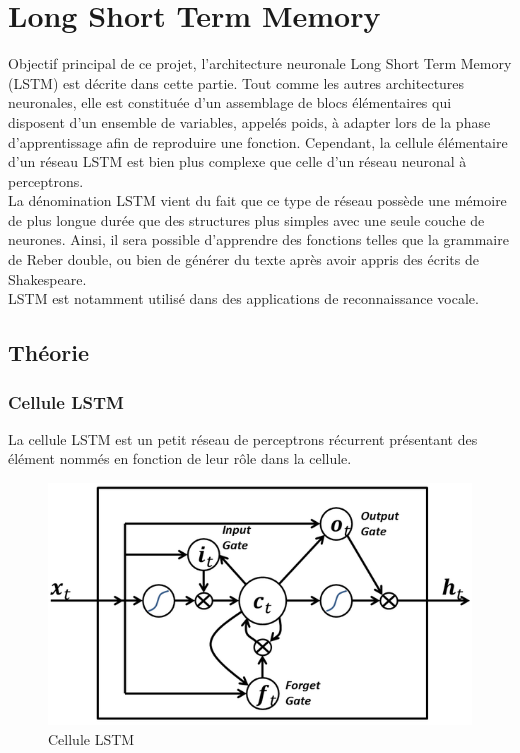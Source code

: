 
\chapter{Long Short Term Memory}

Objectif principal de ce projet, l'architecture neuronale Long Short Term Memory
(LSTM) est décrite dans cette partie. Tout comme les autres architectures
neuronales, elle est constituée d'un assemblage de blocs élémentaires qui
disposent d'un ensemble de variables, appelés poids, à adapter lors de la phase
d'apprentissage afin de reproduire une fonction. Cependant, la cellule
élémentaire d'un réseau LSTM est bien plus complexe que celle d'un réseau
neuronal à perceptrons. \\

La dénomination LSTM vient du fait que ce type de réseau possède une mémoire de
plus longue durée que des structures plus simples avec une seule couche de neurones.
Ainsi, il sera possible d'apprendre des fonctions telles que la grammaire de Reber
double, ou bien de générer du texte après avoir appris des écrits de Shakespeare. \\
LSTM est notamment utilisé dans des applications de reconnaissance vocale.

\section{Théorie}
\subsection{Cellule LSTM}
La cellule LSTM est un petit réseau de perceptrons récurrent présentant des
élément nommés en fonction de leur rôle dans la cellule.

\begin{figure}[!ht]
\begin{center}
\includegraphics[scale=0.8]{images/lstm.png}
\end{center}
\caption{Cellule LSTM}
\end{figure}

